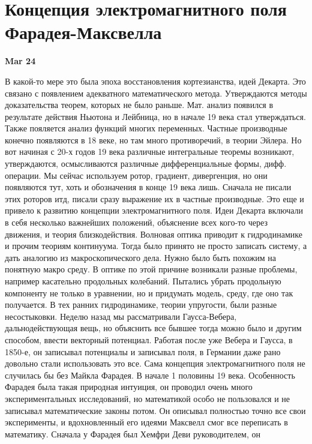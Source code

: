 \documentclass[a4paper, 12pt]{article}
\begin{document}

\section{Концепция электромагнитного поля Фарадея-Максвелла}

\hfill \textbf{Mar 24}

В какой-то мере это была эпоха восстановления кортезианства, идей 
Декарта. Это связано с появлением адекватного математического метода. 
Утверждаются методы доказательства теорем, которых не было раньше. Мат. 
анализ появился в результате действия Ньютона и Лейбница, но в начале 
19 века стал утверждаться. Также пояляется анализ функций многих 
переменных. Частные производные конечно появляются в 18 веке, но там 
много противоречий, в теории Эйлера. Но вот начиная с 20-х годов 19 
века различные интегральные теоремы возникают, утверждаются, 
осмысливаются различные дифференциальные формы, дифф. операции. Мы 
сейчас используем ротор, градиент, дивергенция, но они появляются тут, 
хоть и обозначения в конце 19 века лишь. Сначала не писали этих роторов 
итд, писали сразу выражение их в частные производные. Это еще и привело 
к развитию концепции электромагнитного поля. Идеи Декарта включали 
в себя несколько важнейших положений, объяснение всех кого-то через 
движения, и теория близкодействия. Волновая оптика приводит 
к гидродинамике и прочим теориям континуума. Тогда было принято не 
просто записать систему, а дать аналогию из макроскопического дела. 
Нужно было быть похожим на понятную макро среду. В оптике по этой 
причине возникали разные проблемы, например касательно продольных 
колебаний. Пытались убрать продольную компоненту не только в уравнении, 
но и придумать модель, среду, где оно так получается. В тех ранних 
гидродинамике, теории упругости, были разные несостыковки. Неделю назад 
мы рассматривали Гаусса-Вебера, дальнодействующая вещь, но объяснить все 
бывшее тогда можно было и другим способом, ввести векторный потенциал. 
Работая после уже Вебера и Гаусса, в 1850-е, он записывал потенциалы 
и записывал поля, в Германии даже рано довольно стали использовать это 
все. Сама концепция электромагнитного поля не случилась бы без Майкла 
Фарадея. В начале 1 половины 19 века. Особенность Фарадея была такая 
природная интуиция, он проводил очень много экспериментальных 
исследований, но математикой особо не пользовался и не записывал 
математические законы потом. Он описывал полностью точно все свои 
эксперименты, и вдохновленный его идеями Максвелл смог все переписать 
в математику. Сначала у Фарадея был Хемфри Деви руководителем, он 
\end{document}
